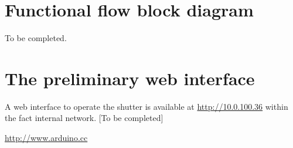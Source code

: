 \documentclass[12pt,a4,twoside]{article}
\begin{document}

\section{Functional flow block diagram}
To be completed.

\section{The preliminary web interface}
A web interface to operate the shutter is available at \href{http://10.0.100.36}{http://10.0.100.36} within the fact internal network. [To be completed]

\begin{thebibliography}{50}
\small
{} \href{http://www.arduino.cc}{http://www.arduino.cc}
\end{thebibliography}
\end{document}
